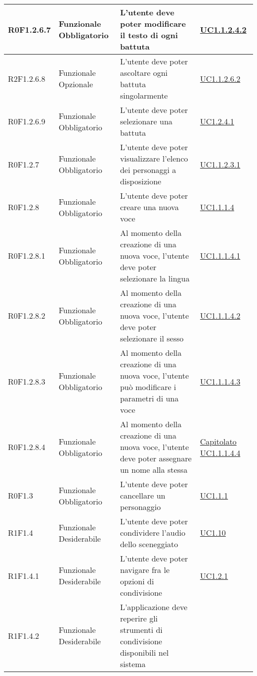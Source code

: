 \begin{center}
\begin{longtable}{| p{2.5cm} | p{3cm} | p{5.25cm} | p{2cm} |}
R0F1.2.6.7 & Funzionale \newline Obbligatorio & L'utente deve poter modificare il testo di ogni battuta &  \hyperref[sec:UC1.1.2.4.2]{ UC1.1.2.4.2 }  \\ \hline  R2F1.2.6.8 & Funzionale \newline Opzionale & L'utente deve poter ascoltare ogni battuta singolarmente &  \hyperref[sec:UC1.1.2.6.2]{ UC1.1.2.6.2 }  \\ \hline  R0F1.2.6.9 & Funzionale \newline Obbligatorio & L'utente deve poter selezionare una battuta &  \hyperref[sec:UC1.2.4.1]{ UC1.2.4.1 }  \\ \hline  R0F1.2.7 & Funzionale \newline Obbligatorio & L'utente deve poter visualizzare l'elenco dei personaggi a disposizione &  \hyperref[sec:UC1.1.2.3.1]{ UC1.1.2.3.1 }  \\ \hline  R0F1.2.8 & Funzionale \newline Obbligatorio & L'utente deve poter creare una nuova voce &  \hyperref[sec:UC1.1.1.4]{ UC1.1.1.4 }  \\ \hline  R0F1.2.8.1 & Funzionale \newline Obbligatorio & Al momento della creazione di una nuova voce, l'utente deve poter selezionare la lingua &  \hyperref[sec:UC1.1.1.4.1]{ UC1.1.1.4.1 }  \\ \hline  R0F1.2.8.2 & Funzionale \newline Obbligatorio & Al momento della creazione di una nuova voce, l'utente deve poter selezionare il sesso &  \hyperref[sec:UC1.1.1.4.2]{ UC1.1.1.4.2 }  \\ \hline  R0F1.2.8.3 & Funzionale \newline Obbligatorio & Al momento della creazione di una nuova voce, l'utente può modificare i parametri di una voce &  \hyperref[sec:UC1.1.1.4.3]{ UC1.1.1.4.3 }  \\ \hline  R0F1.2.8.4 & Funzionale \newline Obbligatorio & Al momento della creazione di una nuova voce, l'utente deve poter assegnare un nome alla stessa &  \hyperref[sec:Capitolato]{ Capitolato } \newline \hyperref[sec:UC1.1.1.4.4]{ UC1.1.1.4.4 }  \\ \hline  R0F1.3 & Funzionale \newline Obbligatorio & L'utente deve poter cancellare un personaggio &  \hyperref[sec:UC1.1.1]{ UC1.1.1 }  \\ \hline  R1F1.4 & Funzionale \newline Desiderabile & L'utente deve poter condividere l'audio dello sceneggiato &  \hyperref[sec:UC1.10]{ UC1.10 }  \\ \hline  R1F1.4.1 & Funzionale \newline Desiderabile & L'utente deve poter navigare fra le opzioni di condivisione &  \hyperref[sec:UC1.2.1]{ UC1.2.1 }  \\ \hline  R1F1.4.2 & Funzionale \newline Desiderabile & L'applicazione deve reperire gli strumenti di condivisione disponibili nel sistema &  
\end{longtable}
\end{center}
